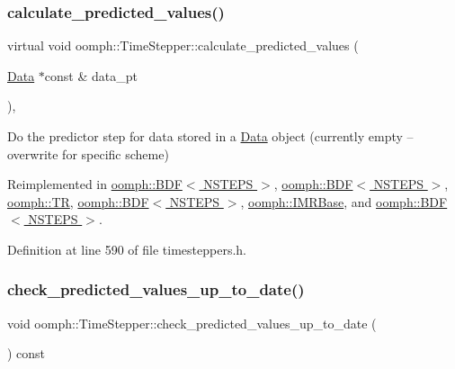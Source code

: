 \subsubsection{\texorpdfstring{calculate\+\_\+predicted\+\_\+values()}{calculate\_predicted\_values()}}
{\footnotesize\ttfamily virtual void oomph\+::\+Time\+Stepper\+::calculate\+\_\+predicted\+\_\+values (\begin{DoxyParamCaption}\item[{\hyperlink{classoomph_1_1Data}{Data} $\ast$const \&}]{data\+\_\+pt }\end{DoxyParamCaption})\hspace{0.3cm}{\ttfamily [inline]}, {\ttfamily [virtual]}}



Do the predictor step for data stored in a \hyperlink{classoomph_1_1Data}{Data} object (currently empty -- overwrite for specific scheme) 



Reimplemented in \hyperlink{classoomph_1_1BDF_a4c3da151a405c2041103cb2795c3ff95}{oomph\+::\+B\+D\+F$<$ N\+S\+T\+E\+P\+S $>$}, \hyperlink{classoomph_1_1BDF_abdf120f326bbd903a94e2fd8d17530b2}{oomph\+::\+B\+D\+F$<$ N\+S\+T\+E\+P\+S $>$}, \hyperlink{classoomph_1_1TR_a345daded718d96bb4b7d4cd2996892c8}{oomph\+::\+TR}, \hyperlink{classoomph_1_1BDF_a5fa759b3a661e7a41ea0dc21f894708d}{oomph\+::\+B\+D\+F$<$ N\+S\+T\+E\+P\+S $>$}, \hyperlink{classoomph_1_1IMRBase_a1512b1a47e5b6dc6c8540fd024c44d1d}{oomph\+::\+I\+M\+R\+Base}, and \hyperlink{classoomph_1_1BDF_a45086cba429e3a8d8b092e4ebe5b82b2}{oomph\+::\+B\+D\+F$<$ N\+S\+T\+E\+P\+S $>$}.



Definition at line 590 of file timesteppers.\+h.

\mbox{\label{classoomph_1_1TimeStepper_a385e522bb6b5c6109e20e860b70e9b6b}} 
\subsubsection{\texorpdfstring{check\+\_\+predicted\+\_\+values\+\_\+up\+\_\+to\+\_\+date()}{check\_predicted\_values\_up\_to\_date()}}
{\footnotesize\ttfamily void oomph\+::\+Time\+Stepper\+::check\+\_\+predicted\+\_\+values\+\_\+up\+\_\+to\+\_\+date (\begin{DoxyParamCaption}{ }\end{DoxyParamCaption}) const\hspace{0.3cm}{\ttfamily [inline]}}



